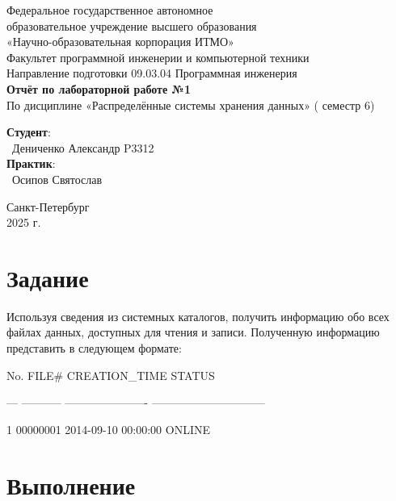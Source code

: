 \documentclass{article}
\begin{document}
\begin{center}
    \Large
    Федеральное государственное автономное \\
    образовательное учреждение высшего образования \\ 
    «Научно-образовательная корпорация ИТМО»\\
    \vspace{0.5cm}
    \large
    Факультет программной инженерии и компьютерной техники \\
    Направление подготовки 09.03.04 Программная инженерия \\
    \vspace{1cm}
    \Large
    \textbf{Отчёт по лабораторной работе №1} \\
        По дисциплине «Распределённые системы хранения данных» ( семестр 6)\\
    \large
    \vspace{8cm}

    \begin{minipage}{.33\textwidth}
    \end{minipage}
    \hfill
    \begin{minipage}{.4\textwidth}
    
        \textbf{Студент}: \vspace{.1cm} \\
        \ Дениченко Александр P3312\\
        \textbf{Практик}:  \\
        \ Осипов Святослав
    \end{minipage}
    \vfill
Санкт-Петербург\\ 2025 г.
\end{center}
\pagestyle{empty}
\newpage
\pagestyle{plain}

\section*{Задание}
Используя сведения из системных каталогов, получить информацию обо всех файлах данных, доступных для чтения и записи. Полученную информацию представить в следующем формате:

No. FILE\#	   CREATION\_TIME	   STATUS

 --- -----------   ----------------------  ------------------------------
  
 1 00000001      2014-09-10 00:00:00     ONLINE


\section*{Выполнение}
\end{document}

